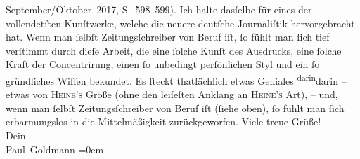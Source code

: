 \begin{ledgroupsized}[t]{13cm}
{{{                        September/Oktober 2017, S. 598–599)}}}\label{K_L02899-1h}. Ich halte
               dasſelbe für eines der vollendetſten Kunſtwerke, welche die neuere deutſche Journaliſtik hervorgebracht hat.
               Wenn man ſelbſt Zeitungsſchreiber von Beruf iſt, ſo fühlt man ſich tief verſtimmt
               durch  dieſe Arbeit, die eine ſolche Kunſt
               des Ausdrucks, eine ſolche Kraft der Concentrirung, einen ſo unbedingt perſönlichen
               Styl und ein ſo gründliches Wiſſen bekundet. Es ſteckt thatſächlich etwas Geniales \substVorne{}\textsuperscript{darin}\substDazwischen{}darin\substHinten{} – {\pb}etwas von \textsc{Heine’s} Größe (ohne den leiſeſten
               Anklang an \textsc{Heine’s} Art), – und, wenn man ſelbſt
               Zeitungsſchreiber von Beruf iſt (ſiehe oben), ſo fühlt man ſich erbarmungslos in die
               Mittelmäßigkeit zurückgeworfen.\pend
           \pstart
           Viele treue Grüße! {\\[\baselineskip]}Dein {\\[\baselineskip]}\spacefill\mbox{Paul Goldmann}\pend
           \leftskip=0em{}
         
         \endnumbering{}\end{ledgroupsized}  \newcommand{\dateiname}{L02899}\newcommand{\titel}{Paul Goldmann an Arthur Schnitzler, 13. 12. [1899]}\newcommand{\editorInnen}{Martin Anton Müller und Laura Untner}
      